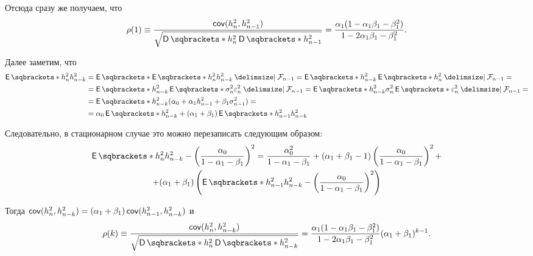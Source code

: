 Отсюда сразу же получаем, что
\[
	\rho(1) \equiv \frac{\cov(h_{n}^{2}, h_{n - 
	1}^{2})}{\sqrt{\D{h_{n}^{2}}\D{h_{n - 1}^{2}}}} = \frac{\alpha_{1}(1 - 
	\alpha_{1}\beta_{1} - \beta_{1}^{2})}{1 - 2\alpha_{1}\beta_{1} - 
	\beta_{1}^{2}}.
\]

Далее заметим, что
\begin{align*}
	\E{h_{n}^{2}h_{n - k}^{2}} &= \E{\E{h_{n}^{2}h_{n - k}^{2} \given \F_{n - 
	1}}} = \E{h_{n - k}^{2}\E{h_{n}^{2} \given \F_{n - 1}}} = \\
	&= \E{h_{n - k}^{2}\E{\sigma_{n}^{2}\epsilon_{n}^{2} \given \F_{n - 1}}} =  
	\E{h_{n - k}^{2}\sigma_{n}^{2}\E{\epsilon_{n}^{2} \given \F_{n - 1}}} = \\
	&= \E{h_{n - k}^{2}(\alpha_{0} + \alpha_{1}h_{n - 1}^{2} + 
	\beta_{1}\sigma_{n - 1}^{2})} = \\
	&= \alpha_{0}\E{h_{n - k}^{2}} + (\alpha_{1} + \beta_{1})\E{h_{n - 
	1}^{2}h_{n - k}^{2}}
\end{align*}

Следовательно, в стационарном случае это можно перезаписать следующим образом:
\begin{multline*}
	\E{h_{n}^{2}h_{n - k}^{2}} - \left(\frac{\alpha_{0}}{1 - \alpha_{1} - 
	\beta_{1}}\right)^{2} = \frac{\alpha_{0}^{2}}{1 - \alpha_{1} - \beta_{1}} + 
	(\alpha_{1} + \beta_{1} - 1)\left(\frac{\alpha_{0}}{1 - \alpha_{1} - 
	\beta_{1}}\right)^{2} + \\
	+ (\alpha_{1} + \beta_{1})\left(\E{h_{n - 1}^{2}h_{n - k}^{2}} - 
	\left(\frac{\alpha_{0}}{1 - \alpha_{1} - \beta_{1}}\right)^{2}\right)
\end{multline*}

Тогда \(\operatorname{\mathsf{cov}}(h_{n}^{2}, h_{n - k}^{2}) = (\alpha_{1} + \beta_{1})\operatorname{\mathsf{cov}}(h_{n - 
1}^{2}, h_{n - k}^{2})\) и
\[
	\rho(k) \equiv \frac{\cov(h_{n}^{2}, h_{n - k}^{2})} 
	{\sqrt{\D{h_{n}^{2}}\D{h_{n - k}^{2}}}} = \frac{\alpha_{1}(1 - 
	\alpha_{1}\beta_{1} - \beta_{1}^{2})}{1 - 2\alpha_{1}\beta_{1} - 
	\beta_{1}^{2}}(\alpha_{1} + \beta_{1})^{k - 1}.
\]